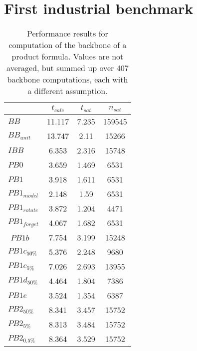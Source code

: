 \section{First industrial benchmark}
\label{sec:sectionVonThore}

\begin{wraptable}[29]{r}{7cm}
\begin{tabular}{l| c c c }
&$t_{calc}$ & $t_{sat}$& $n_{sat}$ \\
\hline
$BB$ & 11.117 & 7.235 & 159545 \\
$BB_{unit}$ & 13.747 & 2.11 & 15266 \\
$IBB$ & 6.353 & 2.316 & 15748 \\
$PB0$ & 3.659 & 1.469 & 6531 \\
$PB1$ & 3.918 & 1.611 & 6531 \\
$PB1_{model}$ & 2.148 & 1.59 & 6531 \\
$PB1_{rotate}$ & 3.872 & 1.204 & 4471 \\
$PB1_{forget}$ & 4.067 & 1.682 & 6531 \\
$%
$%
$PB1b$ & 7.754 & 3.199 & 15248 \\ %
$PB1c_{50\%}$ & 5.376 & 2.248 & 9680 \\
$PB1c_{5\%}$ & 7.026 & 2.693 & 13955 \\
$PB1d_{50\%}$ & 4.464 & 1.804 & 7386 \\
$PB1e$ & 3.524 & 1.354 & 6387 \\
$PB2_{50\%}$ & 8.341 & 3.457 & 15752 \\
$PB2_{5\%}$ & 8.313 & 3.484 & 15752 \\
$PB2_{0.5\%}$ & 8.364 & 3.529 & 15752 \\
\end{tabular}
\caption{Performance results for computation of the backbone of a product formula. Values are not averaged, but summed up over 407 backbone computations, each with a different assumption.}
\label{tab:vonThore1}
\end{wraptable}

